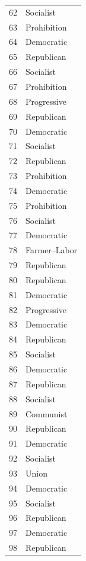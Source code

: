 \documentclass[
  letterpaper,
  DIV=11,
  numbers=noendperiod]{scrreprt}
\begin{document}
\begin{tabular}{ll}
62  &              Socialist \\
63  &            Prohibition \\
64  &             Democratic \\
65  &             Republican \\
66  &              Socialist \\
67  &            Prohibition \\
68  &            Progressive \\
69  &             Republican \\
70  &             Democratic \\
71  &              Socialist \\
72  &             Republican \\
73  &            Prohibition \\
74  &             Democratic \\
75  &            Prohibition \\
76  &              Socialist \\
77  &             Democratic \\
78  &           Farmer–Labor \\
79  &             Republican \\
80  &             Republican \\
81  &             Democratic \\
82  &            Progressive \\
83  &             Democratic \\
84  &             Republican \\
85  &              Socialist \\
86  &             Democratic \\
87  &             Republican \\
88  &              Socialist \\
89  &              Communist \\
90  &             Republican \\
91  &             Democratic \\
92  &              Socialist \\
93  &                  Union \\
94  &             Democratic \\
95  &              Socialist \\
96  &             Republican \\
97  &             Democratic \\
98  &             Republican \\

\end{tabular}
\end{document}
